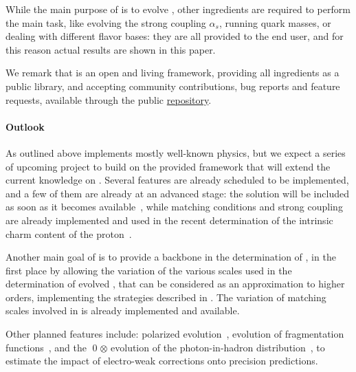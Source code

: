 While the main purpose of \eko{} is to evolve \pdfs, other \qcd{} ingredients
are required to perform the main task, like evolving the strong coupling
$\alpha_s$, running quark masses, or dealing with different flavor bases: they are
all provided to the end user, and for this reason actual results are shown in
this paper.

We remark that \eko{} is an open and living framework,
providing all ingredients as a public library, and accepting community
contributions, bug reports and feature requests, available through the public
\eko{} \href{https://github.com/N3PDF/eko/}{repository}.

\paragraph{Outlook} As outlined above \eko{} implements mostly well-known physics,
but we expect a series of upcoming project to build on the provided framework that will extend
the current knowledge on \pdfs.
Several features are already scheduled to be implemented,
and a few of them are already at an advanced stage:
the \nnnlo{} solution will be included as
soon as it becomes available~\cite{Moch:2021qrk}, while \nnnlo{} matching
conditions and strong coupling are already implemented and used in the
recent determination of the intrinsic charm content of the proton~\cite{Ball:2022qks}.

Another main goal of \eko{} is to provide a backbone in the determination of
\mhou{}, in the first place by allowing
the variation of the various scales used in the determination of evolved \pdfs,
that can be considered as an approximation to higher orders, implementing the
strategies described in \cite{AbdulKhalek:2019ihb}.
The variation of matching scales involved in \vfns{}
is already implemented and available.

Other planned features include: polarized evolution~\cite{Vogt:2008yw,Vogt:2014pha,Blumlein:2021ryt},
evolution of fragmentation functions~\cite{Mitov:2006ic,Moch:2007tx,Almasy:2011eq},
and the \qed$\otimes$\qcd{} evolution of
the photon-in-hadron distribution~\cite{Bertone:2017bme,Xie:2021equ,Cridge:2021pxm},
to estimate the impact of electro-weak corrections onto precision predictions. 

